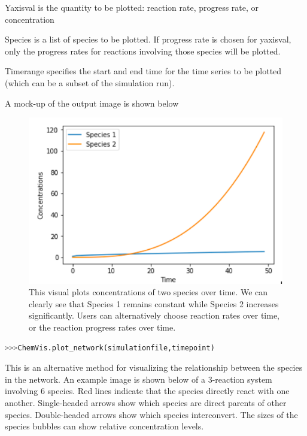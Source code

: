 \documentclass[12pt]{article}
\begin{document}
Yaxisval is the quantity to be plotted: reaction rate, progress rate, or concentration

Species is a list of species to be plotted. If progress rate is chosen for yaxisval, only the progress rates for reactions involving those species will be plotted. 

Timerange specifies the start and end time for the time series to be plotted (which can be a subset of the simulation run). 

A mock-up of the output image is shown below



\begin{figure}[h!]
  \caption{This visual plots concentrations of two species over time. We can clearly see that Species 1 remains constant while Species 2 increases significantly. Users can alternatively choose reaction rates over time, or the reaction progress rates over time. }
  \centering
  \includegraphics[width=\textwidth]{pic1.png}
\end{figure}

\begin{lstlisting}[language = Python, basicstyle = \ttfamily, breaklines = True, columns = fullflexible]
>>>ChemVis.plot_network(simulationfile,timepoint)
\end{lstlisting}

This is an alternative method for visualizing the relationship between the species in the network. 
An example image is shown below of a 3-reaction system involving 6 species. Red lines indicate that the species directly react with one another. Single-headed arrows show which species are direct parents of other species. Double-headed arrows show which species interconvert. The sizes of the species bubbles can show relative concentration levels. 
\end{document}
